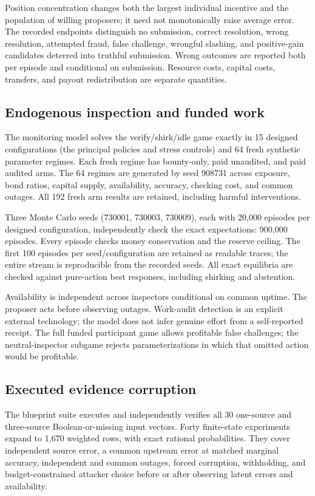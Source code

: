 \documentclass[10pt]{article}
\begin{document}
Position concentration changes both the largest individual incentive and the population of willing proposers; it need not monotonically raise average error. The recorded endpoints distinguish no submission, correct resolution, wrong resolution, attempted fraud, false challenge, wrongful slashing, and positive-gain candidates deterred into truthful submission. Wrong outcomes are reported both per episode and conditional on submission. Resource costs, capital costs, transfers, and payout redistribution are separate quantities.

\subsection{Endogenous inspection and funded work}

The monitoring model solves the verify/shirk/idle game exactly in 15 designed configurations (the principal policies and stress controls) and 64 fresh synthetic parameter regimes. Each fresh regime has bounty-only, paid unaudited, and paid audited arms. The 64 regimes are generated by seed 908731 across exposure, bond ratios, capital supply, availability, accuracy, checking cost, and common outages. All 192 fresh arm results are retained, including harmful interventions.

Three Monte Carlo seeds (730001, 730003, 730009), each with 20{,}000 episodes per designed configuration, independently check the exact expectations: 900{,}000 episodes. Every episode checks money conservation and the reserve ceiling. The first 100 episodes per seed/configuration are retained as readable traces; the entire stream is reproducible from the recorded seeds. All exact equilibria are checked against pure-action best responses, including shirking and abstention.

Availability is independent across inspectors conditional on common uptime. The proposer acts before observing outages. Work-audit detection is an explicit external technology; the model does not infer genuine effort from a self-reported receipt. The full funded participant game allows profitable false challenges; the neutral-inspector subgame rejects parameterizations in which that omitted action would be profitable.

\subsection{Executed evidence corruption}

The blueprint suite executes and independently verifies all 30 one-source and three-source Boolean-or-missing input vectors. Forty finite-state experiments expand to 1{,}670 weighted rows, with exact rational probabilities. They cover independent source error, a common upstream error at matched marginal accuracy, independent and common outages, forced corruption, withholding, and budget-constrained attacker choice before or after observing latent errors and availability.
\end{document}
